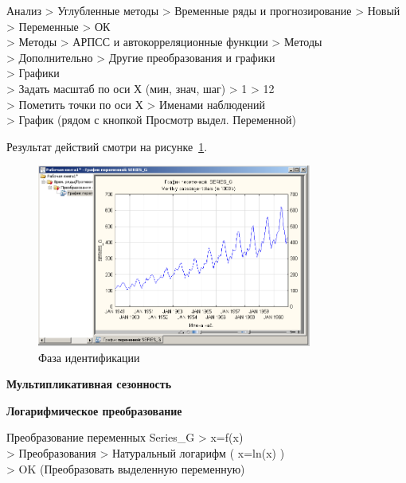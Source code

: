 Анализ > Углубленные методы > Временные ряды и прогнозирование > Новый\\
> Переменные > ОК\\
> Методы > АРПСС и автокорреляционные функции > Методы \\
> Дополнительно > Другие преобразования и графики\\
> Графики\\
> Задать масштаб по оси Х (мин, знач, шаг) > 1 > 12\\
> Пометить точки по оси Х > Именами наблюдений\\
> График (рядом с кнопкой Просмотр выдел. Переменной)

Результат действий смотри на рисунке~\ref{fig:3}.

\begin{figure}[!h]
  \centering

  \includegraphics[height=6cm]
  {inc/3.PNG}

  \caption{Фаза идентификации}

  \label{fig:3}
\end{figure}

\begin{center}
  \textbf{Мультипликативная сезонность}
\end{center}


\begin{center}
  \textbf{Логарифмическое преобразование}
\end{center}

Преобразование переменных Series\_G > x=f(x)\\
> Преобразования > Натуральный логарифм ( x=ln(x) )\\
> OK (Преобразовать выделенную переменную)

